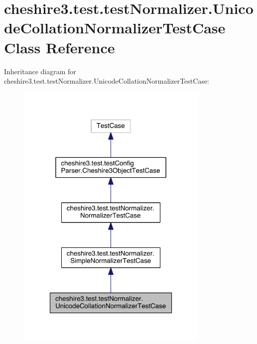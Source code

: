 \hypertarget{classcheshire3_1_1test_1_1test_normalizer_1_1_unicode_collation_normalizer_test_case}{\section{cheshire3.\-test.\-test\-Normalizer.\-Unicode\-Collation\-Normalizer\-Test\-Case Class Reference}
\label{classcheshire3_1_1test_1_1test_normalizer_1_1_unicode_collation_normalizer_test_case}
}


Inheritance diagram for cheshire3.\-test.\-test\-Normalizer.\-Unicode\-Collation\-Normalizer\-Test\-Case\-:
\nopagebreak
\begin{figure}[H]
\begin{center}
\leavevmode
\includegraphics[width=262pt]{classcheshire3_1_1test_1_1test_normalizer_1_1_unicode_collation_normalizer_test_case__inherit__graph}
\end{center}
\end{figure}


